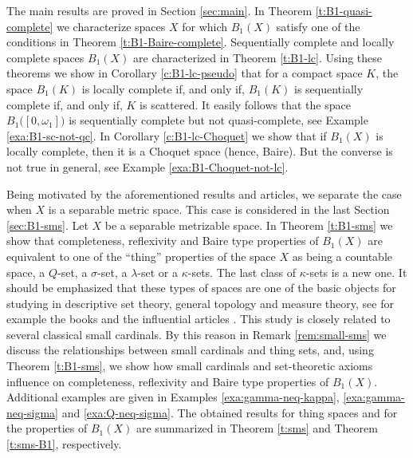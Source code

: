 \documentclass[preprint,11pt]{elsarticle}
\numberwithin{equation}{section}
\numberwithin{theorem}{section}
\newcommand{\w}{\omega}
\begin{document}
The main results are proved in Section \ref{sec:main}. In Theorem \ref{t:B1-quasi-complete} we characterize spaces $X$ for which $B_1(X)$ satisfy one of the conditions in Theorem \ref{t:B1-Baire-complete}. Sequentially complete and locally complete spaces $B_1(X)$ are characterized in Theorem \ref{t:B1-lc}. Using these theorems   we show in Corollary \ref{c:B1-lc-pseudo} that for a compact space $K$, the space $B_1(K)$ is locally complete if, and only if, $B_1(K)$ is sequentially complete  if, and only if,  $K$ is scattered. It easily follows that the space $B_1\big([0,\w_1]\big)$ is sequentially complete but not quasi-complete, see Example \ref{exa:B1-sc-not-qc}. In Corollary \ref{c:B1-lc-Choquet} we show that if $B_1(X)$ is locally complete, then it is a Choquet space (hence, Baire). But the converse is not true in general, see Example \ref{exa:B1-Choquet-not-lc}.


Being motivated by the aforementioned results and articles, we separate the case when $X$ is a separable metric space. This case is considered in the last Section \ref{sec:B1-sms}. Let $X$ be a separable metrizable space. In Theorem \ref{t:B1-sms} we show that completeness, reflexivity and Baire type properties of $B_1(X)$ are equivalent to one of the  ``thing'' properties of the space $X$ as being a countable space, a $Q$-set, a $\sigma$-set, a $\lambda$-set or a $\kappa$-sets. The last class of $\kappa$-sets is a new one. It should be emphasized that these types of spaces are one of the basic objects for studying in descriptive set theory, general topology and measure theory, see for example the books \cite{Bukovsky2011,Kechris,Kuratowski,Miller2017} and the influential articles \cite{vD,Miller}. This study is closely related to several classical small cardinals. By this reason  in Remark \ref{rem:small-sms} we discuss the relationships between small cardinals and thing sets, and, using Theorem \ref{t:B1-sms}, we show how small cardinals and set-theoretic axioms influence on completeness, reflexivity and Baire type properties of $B_1(X)$. Additional examples are given in Examples \ref{exa:gamma-neq-kappa}, \ref{exa:gamma-neq-sigma} and \ref{exa:Q-neq-sigma}. The obtained results for thing spaces and for the properties of $B_1(X)$ are summarized in Theorem \ref{t:sms} and Theorem \ref{t:sms-B1}, respectively.



\end{document}
